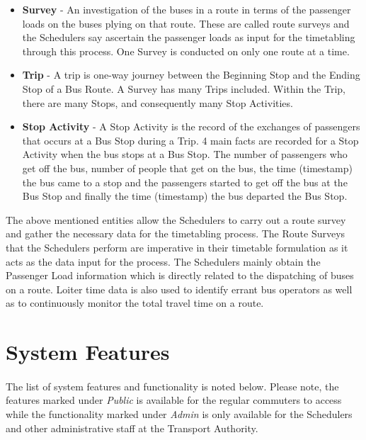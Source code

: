 \begin {itemize}
\item \textbf{Survey} - An investigation of the buses in a route in terms of the passenger loads on the buses plying on that route. These are called route surveys and the Schedulers say ascertain the passenger loads as input for the timetabling through this process. One Survey is conducted on only one route at a time.
\item \textbf{Trip} - A trip is one-way journey between the Beginning Stop and the Ending Stop of a Bus Route. A Survey has many Trips included. Within the Trip, there are many Stops, and consequently many Stop Activities.
\item \textbf{Stop Activity} - A Stop Activity is the record of the exchanges of passengers that occurs at a Bus Stop during a Trip. 4 main facts are recorded for a Stop Activity when the bus stops at a Bus Stop. The number of passengers who get off the bus, number of people that get on the bus, the time (timestamp) the bus came to a stop and the passengers started to get off the bus at the Bus Stop and finally the time (timestamp) the bus departed the Bus Stop.
\end {itemize}

The above mentioned entities allow the Schedulers to carry out a route survey and gather the necessary data for the timetabling process. The Route Surveys that the Schedulers perform are imperative in their timetable formulation as it acts as the data input for the process. The Schedulers mainly obtain the Passenger Load information which is directly related to the dispatching of buses on a route. Loiter time data is also used to identify errant bus operators as well as to continuously monitor the total travel time on a route.



\section{System Features}
\label{systemFeatures}

\paragraph{ } The list of system features and functionality is noted below. Please note, the features marked under \textit{Public} is available for the regular commuters to access while the functionality marked under \textit{Admin} is only available for the Schedulers and other administrative staff at the Transport Authority.

